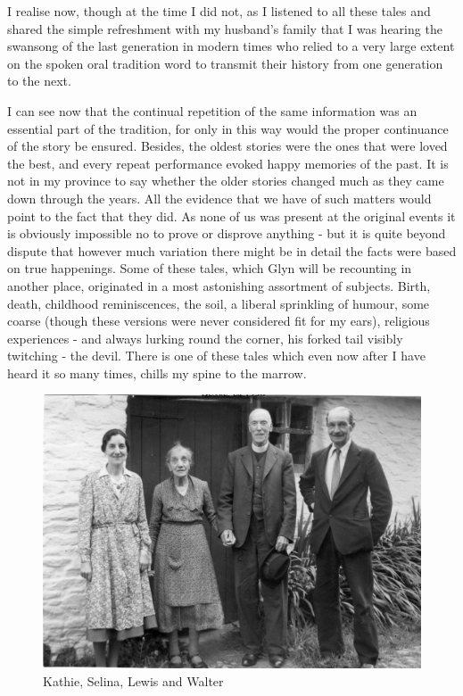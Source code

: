 I realise now, though at the time I did not, as I listened to all these tales and shared the simple refreshment with my husband's family that I was hearing the swansong of the last generation in modern times who relied to a very large extent on the spoken oral tradition word to transmit their history from one generation to the next.

I can see now that the continual repetition of the same information was an essential part of the tradition, for only in this way would the proper continuance of the story be ensured. Besides, the oldest stories were the ones that were loved the best, and every repeat performance evoked happy memories of the past. It is not in my province to say whether the older stories changed much as they came down through the years. All the evidence that we have of such matters would point to the fact that they did. As none of us was present at the original events it is obviously impossible no to prove or disprove anything - but it is quite beyond dispute that however much variation there might be in detail the facts were based on true happenings. Some of these tales, which Glyn will be recounting in another place, originated in a most astonishing assortment of subjects. Birth, death, childhood reminiscences, the soil, a liberal sprinkling of humour, some coarse (though these versions were never considered fit for my ears), religious experiences - and always lurking round the corner, his forked tail visibly twitching - the devil. There is one of these tales which even now after I have heard it so many times, chills my spine to the marrow.
 
\begin{figure}
     \includegraphics[width=1\textwidth]{figures/familyPhoto}
     \caption{Kathie, Selina, Lewis and Walter}
     \label{fig:Family}
\end{figure}

